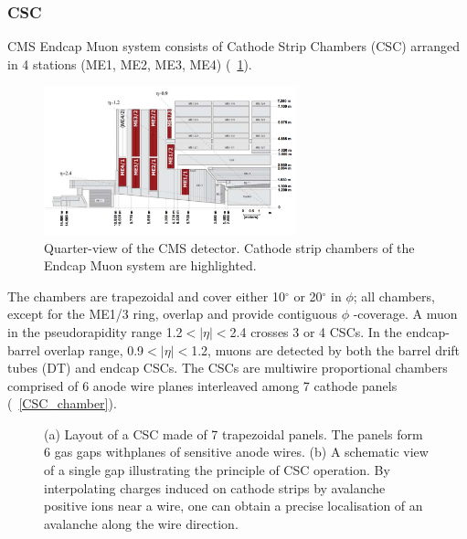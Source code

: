 \subsubsection{CSC}
CMS Endcap Muon system consists of Cathode Strip Chambers (CSC) arranged in 4 stations (ME1, ME2, ME3, ME4) (\figurename~\ref{CSC}). 
\begin{figure}[h!]
 \centering
 \includegraphics[width=0.65\textwidth]{Images/CSC}
 \caption{Quarter-view of the CMS detector. Cathode strip chambers of the Endcap Muon system are highlighted.}
\label{CSC}
\end{figure}
The chambers are trapezoidal and cover either 10$^\circ$ or 20$^\circ$ in $\phi$; all chambers, except for the ME1/3 ring, overlap and provide contiguous $\phi$ -coverage. A muon in the pseudorapidity range 1.2$<|\eta|<$2.4 crosses 3 or 4 CSCs. In the endcap-barrel overlap range, 0.9$<|\eta|<$1.2, muons are detected by both the barrel drift tubes (DT) and endcap CSCs. 
The CSCs are multiwire proportional chambers comprised of 6 anode wire planes interleaved among 7 cathode panels (\figurename~\ref{CSC_chamber}). 
\begin{figure}[htbp]
	\centering
	 \quad
	\caption{ (a) Layout of a CSC made of 7 trapezoidal panels. The panels form 6 gas gaps withplanes of sensitive anode wires. (b) A schematic view of a single gap illustrating the principle of CSC operation. By interpolating charges induced on cathode strips by avalanche positive ions near a wire, one can obtain a precise localisation of an avalanche along the wire direction.}
\end{figure}
